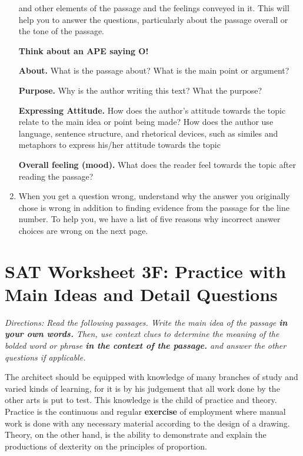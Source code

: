 \begin{enumerate}[leftmargin=0cm,labelwidth=\itemindent,labelsep=0cm,align=left,label={\bfseries Strategy \#\arabic*:\ }]
\longline and other elements of the passage and the feelings conveyed in it. This will help you to answer the questions, particularly about the passage overall or the tone of the passage. 

\centerline{\textbf{Think about an APE saying O!}}

\textbf{About.} What is the passage about? What is the main point or argument? 

\bigskip
\textbf{Purpose.} Why is the author writing this text? What the purpose?

\bigskip
\textbf{Expressing Attitude.} How does the author's attitude towards the topic relate to the main idea or point being made? How does the author use language, sentence structure, and rhetorical devices, such as similes and metaphors to express his/her attitude towards the topic

\bigskip
\textbf{Overall feeling (mood).} What does the reader feel towards the topic after reading the passage? 

\bigskip
\item When you get a question wrong, understand why the answer you originally chose is wrong in addition to finding evidence from the passage for the line number. To help you, we have a list of five reasons why incorrect answer choices are wrong on the next page. 
\end{enumerate}

\newpage

\section[Main Ideas and Details]{SAT Worksheet 3F: Practice with Main Ideas and Detail Questions}
\textit{Directions: Read the following passages. Write the main idea of the passage \textbf{in your own words.} Then, use context clues to determine the meaning of the bolded word or phrase \textbf{in the context of the passage.} and answer the other questions if applicable.}

\bigskip
\begin{linenumbers*}
\modulolinenumbers[5]
\indent The architect should be equipped with knowledge of many branches of study and varied kinds of learning, for it is by his judgement that all work done by the other arts is put to test. This knowledge is the child of practice and theory. Practice is the continuous and regular \textbf{exercise} of employment where manual work is done with any necessary material according to the design of a drawing. Theory, on the other hand, is the ability to demonstrate and explain the productions of dexterity on the principles of proportion.
\end{linenumbers*}

